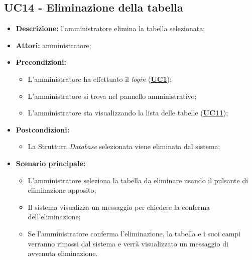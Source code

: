 \subsection{UC14 - Eliminazione della tabella}
\label{sec:UC14}
\begin{itemize}
	\item \textbf{Descrizione:} l’amministratore elimina la tabella selezionata;
	\item \textbf{Attori:} amministratore;
	\item \textbf{Precondizioni:} 
	\begin{itemize}
		\item L’amministratore ha effettuato il \textit{login} (\hyperref[sec:UC1]{\textbf{UC1}});
		\item L’amministratore si trova nel pannello amministrativo;
		\item L’amministratore sta visualizzando la lista delle tabelle (\hyperref[sec:UC11]{\textbf{UC11}});
	\end{itemize}
	\item \textbf{Postcondizioni:} 
	\begin{itemize}
		\item La Struttura \textit{Database} selezionata viene eliminata dal sistema;
	\end{itemize}
	\item \textbf{Scenario principale:} 
	\begin{itemize}
		\item L'amministratore seleziona la tabella da eliminare usando il pulsante di eliminazione apposito;
		\item Il sistema visualizza un messaggio per chiedere la conferma dell'eliminazione;
		\item Se l'amministratore conferma l'eliminazione, la tabella e i suoi campi verranno rimossi dal sistema e verrà visualizzato un messaggio di avvenuta eliminazione.
	\end{itemize}
\end{itemize}

